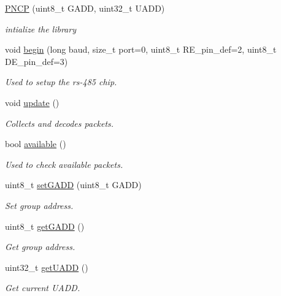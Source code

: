 \begin{DoxyCompactItemize}
\item 
\hyperlink{class_p_n_c_p_ade922129d20c574d2a962f3ff0cd4ea3}{P\+N\+CP} (uint8\+\_\+t G\+A\+DD, uint32\+\_\+t U\+A\+DD)
\begin{DoxyCompactList}\small\item\em intialize the library \end{DoxyCompactList}\item 
void \hyperlink{class_p_n_c_p_ae37424d9ee5f2232e0fc1f3d9e81f0ad}{begin} (long baud, size\+\_\+t port=0, uint8\+\_\+t R\+E\+\_\+pin\+\_\+def=2, uint8\+\_\+t D\+E\+\_\+pin\+\_\+def=3)
\begin{DoxyCompactList}\small\item\em Used to setup the rs-\/485 chip. \end{DoxyCompactList}\item 
void \hyperlink{class_p_n_c_p_ab292e3b595289320a03ed6179750942d}{update} ()
\begin{DoxyCompactList}\small\item\em Collects and decodes packets. \end{DoxyCompactList}\item 
bool \hyperlink{class_p_n_c_p_a153136448f88a3d2ac580c329620aea4}{available} ()
\begin{DoxyCompactList}\small\item\em Used to check available packets. \end{DoxyCompactList}\item 
uint8\+\_\+t \hyperlink{class_p_n_c_p_a14efa4c46289d86be1a49f8e5594f396}{set\+G\+A\+DD} (uint8\+\_\+t G\+A\+DD)
\begin{DoxyCompactList}\small\item\em Set group address. \end{DoxyCompactList}\item 
uint8\+\_\+t \hyperlink{class_p_n_c_p_ae885bf46891dfdc36def5b8e8337f5b8}{get\+G\+A\+DD} ()
\begin{DoxyCompactList}\small\item\em Get group address. \end{DoxyCompactList}\item 
uint32\+\_\+t \hyperlink{class_p_n_c_p_a5690f103c1f9878652ed09fff85bafb8}{get\+U\+A\+DD} ()
\begin{DoxyCompactList}\small\item\em Get current U\+A\+DD. \end{DoxyCompactList}\item 

\end{DoxyCompactItemize}
